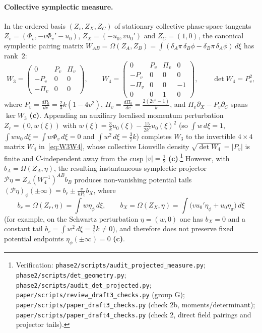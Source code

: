 \documentclass[11pt,a4paper]{article}
\newcommand{\lab}[1]{{\normalfont\sffamily\footnotesize\bfseries(#1)}}
\newcommand{\Lc}{\lab{c}}
\newcommand{\scr}[1]{\nolinkurl{#1}}
\newcommand{\chk}[1]{\footnote{\raggedright Verification: #1.}}
\theoremstyle{remark}
\begin{document}
\paragraph{Collective symplectic measure.} In the ordered basis $(Z_v,Z_X,Z_C)$ of stationary collective phase-space tangents $Z_v=(\Phi_v,-v\Phi_v'-u_0)$, $Z_X=(-u_0,vu_0')$ and $Z_C=(1,0)$, the canonical symplectic pairing matrix $W_{AB}=\Omega(Z_A,Z_B)=\int(\delta_A\pi\,\delta_B\phi-\delta_B\pi\,\delta_A\phi)\,d\xi$ has rank~$2$:
\begin{equation}\label{eq:W3W4}
W_3=\begin{pmatrix}0&P_v&\Pi_v\\ -P_v&0&0\\ -\Pi_v&0&0\end{pmatrix},\qquad
W_4=\begin{pmatrix}0&P_v&\Pi_v&0\\ -P_v&0&0&0\\ -\Pi_v&0&0&-1\\ 0&0&1&0\end{pmatrix},\qquad
\det W_4=P_v^2,
\end{equation}
where $P_v=\frac{dP_0}{dv}=\tfrac23k(1-4v^2)$, $\Pi_v=\frac{d\Pi_0}{dv}=\frac{2(2v^2-1)}k$, and $\Pi_v\partial_X-P_v\partial_C$ spans $\ker W_3$ \Lc. Appending an auxiliary localised momentum perturbation $Z_r=(0,w(\xi))$ with $w(\xi)=\frac3ku_0(\xi)-\frac{15}{2k^3}u_0(\xi)^2$ (so $\int w\,d\xi=1$, $\int wu_0\,d\xi=\int w\Phi_v\,d\xi=0$ and $\int w^2\,d\xi=\tfrac37k$) completes $W_3$ to the invertible $4\times4$ matrix $W_4$ in~\eqref{eq:W3W4}, whose collective Liouville density $\sqrt{\det W_4}=|P_v|$ is finite and $C$-independent away from the cusp $|v|=\tfrac12$ \Lc.\chk{\scr{phase2/scripts/audit_projected_measure.py}; \scr{phase2/scripts/det_geometry.py}; \scr{phase2/scripts/audit_det_projected.py}; \scr{paper/scripts/review_draft3_checks.py} (group G); \scr{paper/scripts/paper_draft3_checks.py} (check 2b, moments/determinant); \scr{paper/scripts/paper_draft4_checks.py} (check 2, direct field pairings and projector tails)}
However, with $b_A=\Omega(Z_A,\eta)$, the resulting instantaneous symplectic projector $\mathcal P\eta=Z_A(W_4^{-1})^{AB}b_B$ produces non-vanishing potential tails $(\mathcal P\eta)_\phi(\pm\infty)=b_r\pm\frac{v}{kP_v}b_X$, where
\[
b_r=\Omega(Z_r,\eta)=\int w\eta_\phi\,d\xi,\qquad
b_X=\Omega(Z_X,\eta)=\int\big(vu_0'\eta_\phi+u_0\eta_\pi\big)\,d\xi
\]
(for example, on the Schwartz perturbation $\eta=(w,0)$ one has $b_X=0$ and a constant tail $b_r=\int w^2\,d\xi=\tfrac37k\neq0$), and therefore does not preserve fixed potential endpoints $\eta_\phi(\pm\infty)=0$ \Lc.
\end{document}
